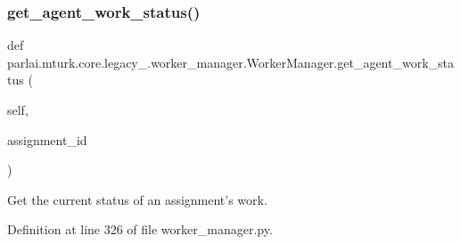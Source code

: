 \subsubsection{\texorpdfstring{get\+\_\+agent\+\_\+work\+\_\+status()}{get\_agent\_work\_status()}}
{\footnotesize\ttfamily def parlai.\+mturk.\+core.\+legacy\+\_.\+worker\+\_\+manager.\+Worker\+Manager.\+get\+\_\+agent\+\_\+work\+\_\+status (\begin{DoxyParamCaption}\item[{}]{self,  }\item[{}]{assignment\+\_\+id }\end{DoxyParamCaption})}

\begin{DoxyVerb}Get the current status of an assignment's work.
\end{DoxyVerb}
 

Definition at line 326 of file worker\+\_\+manager.\+py.


